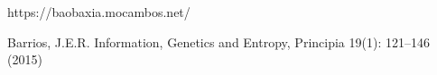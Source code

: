 \documentclass[
12pt,		%
openright,	%
twoside,  %
a4paper,			%
chapter=TITLE,		%
english,			%
french,				%
spanish,			%
brazil				%
]{USPSC-classe/USPSC}
\begin{document}
\begin{flushleft}
\begin{flushleft}
\begin{flushleft}
\begin{flushleft}
\begin{flushleft}
\begin{flushleft}
\begin{flushleft}
\begin{flushleft}
\begin{flushleft}
[BAOBAXIA, 2003] https://baobaxia.mocambos.net/
\end{flushleft}


\end{flushleft}


\end{flushleft}


\end{flushleft}


\end{flushleft}


\end{flushleft}


\end{flushleft}


\end{flushleft}


\end{flushleft}


\begin{flushleft}
\begin{flushleft}
\begin{flushleft}
\begin{flushleft}
\begin{flushleft}
\begin{flushleft}
\begin{flushleft}
\begin{flushleft}
\begin{flushleft}
[BARRIOS, 2015] Barrios, J.E.R. Information, Genetics and Entropy, Principia 19(1): 121–146 (2015)
\end{flushleft}


\end{flushleft}


\end{flushleft}


\end{flushleft}


\end{flushleft}


\end{flushleft}


\end{flushleft}


\end{flushleft}


\end{flushleft}
\end{document}
